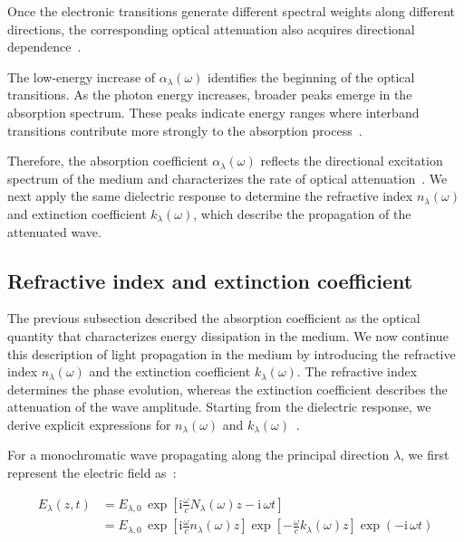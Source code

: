 Once the electronic transitions generate different spectral weights along different directions,
the corresponding optical attenuation also acquires directional dependence~\cite{suk2024ultrafast}.

The low-energy increase of $\alpha_{\lambda}(\omega)$ identifies the beginning of the optical transitions.
As the photon energy increases, broader peaks emerge in the absorption spectrum.
These peaks indicate energy ranges where interband transitions contribute more strongly to the absorption process~\cite{elbanna20232d}.

Therefore, the absorption coefficient $\alpha_{\lambda}(\omega)$ reflects the directional excitation spectrum of the medium and characterizes the rate of optical attenuation~\cite{niu2024electronic,khan2025insight,zhang2024advanced,elbanna20232d}.
We next apply the same dielectric response to determine the refractive index $n_{\lambda}(\omega)$ and extinction coefficient $k_{\lambda}(\omega)$,
which describe the propagation of the attenuated wave.

\subsection{Refractive index and extinction coefficient}

The previous subsection described the absorption coefficient as the optical quantity that characterizes energy dissipation in the medium.
We now continue this description of light propagation in the medium by introducing the refractive index $n_{\lambda}(\omega)$ and the extinction coefficient $k_{\lambda}(\omega)$.
The refractive index determines the phase evolution,
whereas the extinction coefficient describes the attenuation of the wave amplitude.
Starting from the dielectric response,
we derive explicit expressions for $n_{\lambda}(\omega)$ and $k_{\lambda}(\omega)$~\cite{born2013principles,wooten2013optical,dressel2002electrodynamics,fox2010optical}.

For a monochromatic wave propagating along the principal direction $\lambda$,
we first represent the electric field as~\cite{politano2023spectroscopic}:

\begin{equation}
\begin{aligned}
    E_{\lambda}(z,t)
    &= E_{\lambda,0}\,
    \exp\left[\mathrm{i}\frac{\omega}{c}N_{\lambda}(\omega)z-\mathrm{i}\,\omega t\right]\\
    &= E_{\lambda,0}\,
    \exp\left[\mathrm{i}\frac{\omega}{c}n_{\lambda}(\omega)z\right]
    \exp\left[-\frac{\omega}{c}k_{\lambda}(\omega)z\right]
    \exp\left(-\mathrm{i}\,\omega t\right)
\end{aligned}
\label{monochromatic_wave_with_complex_refractive_index}
\end{equation}

